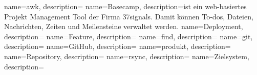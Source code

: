  {
  name=awk,
  description={}
}
 {
  name=Basecamp,
  description={ist ein web-basiertes Projekt Management Tool der Firma 37signals. Damit können To-dos, Dateien, Nachrichten, Zeiten und Meilensteine verwaltet werden.}
}
 {
  name=Deployment,
  description={}
}
 {
  name=Feature,
  description={}
}
 {
  name=find,
  description={}
}
 {
  name=git,
  description={}
}
 {
  name=GitHub,
  description={}
}
 {
  name=produkt,
  description={}
}
 {
  name=Repository,
  description={}
}
 {
  name=rsync,
  description={}
}
 {
  name=Zielsystem,
  description={}
}


\makeglossaries
